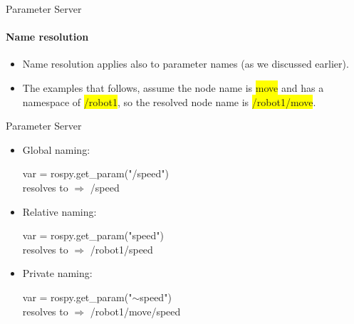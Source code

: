 \documentclass{beamer}
\begin{document}
\begin{frame}{Parameter Server}
    \framesubtitle{Name resolution}



    \begin{itemize}
        \item Name resolution applies also to parameter names (as we discussed earlier).
        
        
        \item The examples that follows, assume the node name is {\ttfamily \colorbox{yellow}{move}}  and has a namespace of {\ttfamily \colorbox{yellow}{/robot1}}, so the resolved node name is   {\ttfamily \colorbox{yellow}{/robot1/move}}.
    \end{itemize}
\end{frame}


\begin{frame}{Parameter Server}

    \begin{itemize}
        \item Global naming:
        \begin{focus}
            \centering
            \fontsize{9}{1} \ttfamily  var = rospy.get\_param("/speed") \\ \vspace{0.2cm}  resolves to  $\Rightarrow$ {\color{red} /speed}
        \end{focus}
        
        \item Relative naming:
        \begin{focus}
            \centering
            \fontsize{9}{1} \ttfamily var = rospy.get\_param("speed")\\ \vspace{0.2cm}  resolves to  $\Rightarrow$ {\color{red} /robot1/speed}
        \end{focus}  
        
        \item Private naming:
        \begin{focus}
            \centering
            \fontsize{9}{1} \ttfamily var = rospy.get\_param("$\sim$speed")\\ \vspace{0.2cm}  resolves to  $\Rightarrow$ {\color{red} /robot1/move/speed}
        \end{focus}        
        
    \end{itemize}
    
\end{frame}
\end{document}

